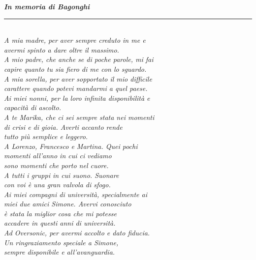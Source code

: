 \thispagestyle{empty}

\begin{flushright}
  \Large{\textit{\textbf{In memoria di Bagonghi}}}\\
  \rule{0.8\linewidth}{0.4pt}\\
  \vspace{0.5em}
  \normalsize
  \textit{A mia madre, per aver sempre creduto in me e \\ avermi spinto a dare oltre il massimo.} \\
  \vspace{1em}
  \textit{A mio padre, che anche se di poche parole, mi fai \\ capire quanto tu sia fiero di me con lo sguardo.} \\
  \vspace{1em}
  \textit{A mia sorella, per aver sopportato il mio difficile \\ carattere quando potevi mandarmi a quel paese.} \\
  \vspace{1em}
  \textit{Ai miei nonni, per la loro infinita disponibilità e \\ capacità di ascolto.} \\
  \vspace{1em}
  \textit{A te Marika, che ci sei sempre stata nei momenti\\ di crisi e di gioia. Averti accanto rende\\ tutto più semplice e leggero. } \\
  \vspace{1em}
  \textit{A Lorenzo, Francesco e Martina. Quei pochi\\ momenti all'anno in cui ci vediamo\\ sono momenti che porto nel cuore.} \\
  \vspace{1em}
  \textit{A tutti i gruppi in cui suono. Suonare\\ con voi è una gran valvola di sfogo. } \\
  \vspace{1em}
  \textit{Ai miei compagni di università, specialmente ai\\ miei due amici Simone. Avervi conosciuto\\ è stata la miglior cosa che mi potesse\\ accadere in questi anni di università.} \\
  \vspace{1em}
  \textit{Ad Oversonic, per avermi accolto e dato fiducia. \\ Un ringraziamento speciale a Simone,\\ sempre disponibile e all'avanguardia.} \\

\end{flushright}
